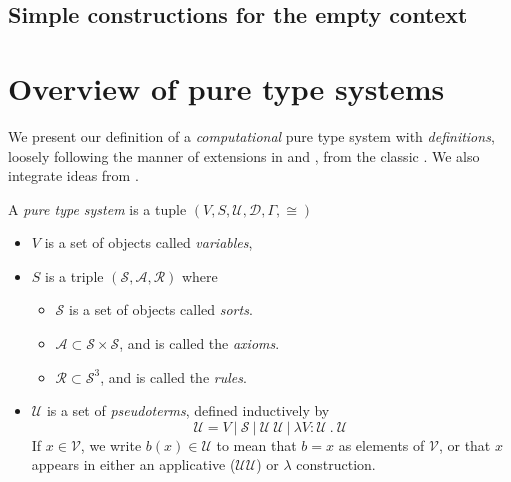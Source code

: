 \subsection{Simple constructions for the empty context}

\section{Overview of pure type systems}

We present our definition of a \emph{computational} pure type system with \emph{definitions}, loosely following the manner of extensions in \cite{ClassicalPTS97} and \cite{PTSWithDefinitions}, from the classic \cite{BarendregtPTS1}. We also integrate ideas from \cite{RhoCalculus}.

 
\begin{definition}\label{puretypesysdef}
    A \emph{pure type system} is a tuple $(V,S,\mathcal{U},\mathcal{D},\Gamma,\cong)$
    \begin{itemize}
        \item $V$ is a set of objects called \emph{variables},
        
        \item $S$ is a triple $(\mathcal{S},\mathcal{A},\mathcal{R})$ where
        \begin{itemize}
            \item $\mathcal{S}$ is a set of objects called \emph{sorts}.
            \item $\mathcal{A} \subset \mathcal{S}\times\mathcal{S}$, and is called the \emph{axioms}.
            \item $\mathcal{R} \subset \mathcal{S}^3$, and is called the \emph{rules}.
        \end{itemize}
        
        \item $\mathcal{U}$ is a set of \emph{pseudoterms}, defined inductively by 
            \begin{equation*}
                \mathcal{U} = V\ |\ \mathcal{S}\ |\ \mathcal{U}\ \mathcal{U}\ |\ \lambda V : \mathcal{U}\ .\ \mathcal{U}\  %
            \end{equation*}
        If $x \in \mathcal{V}$, we write $b(x) \in \mathcal{U}$ to mean that $b = x$ as elements of $\mathcal{V}$, or that $x$ appears in either an applicative ($\mathcal{U} \mathcal{U}$) or $\lambda$ construction.


\end{itemize}
\end{definition}
